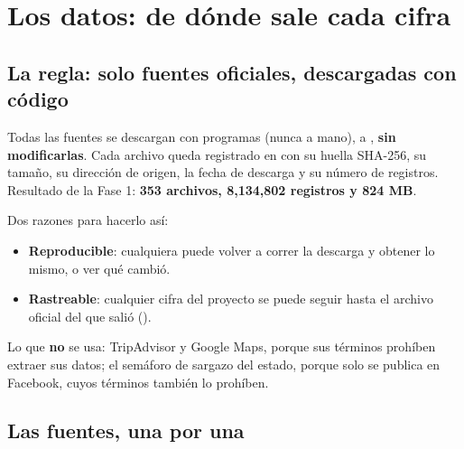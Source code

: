 \chapter{Los datos: de dónde sale cada cifra}
\label{cap:datos}

\section{La regla: solo fuentes oficiales, descargadas con código}
Todas las fuentes se descargan con programas (nunca a mano), a , \textbf{sin
modificarlas}. Cada archivo queda registrado en  con su huella SHA-256, su tamaño, su
dirección de origen, la fecha de descarga y su número de registros. Resultado de la Fase 1: \textbf{353 archivos,
8,134,802 registros y 824 MB}.

Dos razones para hacerlo así:
\begin{itemize}
\item \textbf{Reproducible}: cualquiera puede volver a correr la descarga y obtener lo mismo, o ver qué cambió.
\item \textbf{Rastreable}: cualquier cifra del proyecto se puede seguir hasta el archivo oficial del que salió
  ().
\end{itemize}
Lo que \textbf{no} se usa: TripAdvisor y Google Maps, porque sus términos prohíben extraer sus datos; el semáforo de
sargazo del estado, porque solo se publica en Facebook, cuyos términos también lo prohíben.

\section{Las fuentes, una por una}

